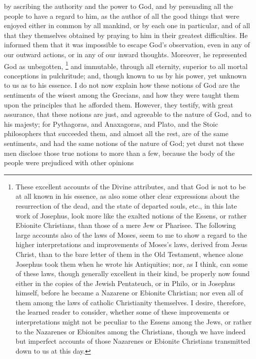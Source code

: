 by ascribing the authority and the power to God, and by persuading all the
people to have a regard to him, as the author of all the good things that
were enjoyed either in common by all mankind, or by each one in
particular, and of all that they themselves obtained by praying to him in
their greatest difficulties. He informed them that it was impossible to
escape God's observation, even in any of our outward actions, or in any of
our inward thoughts. Moreover, he represented God as unbegotten, \footnote{These excellent accounts
of the Divine attributes, and that God is not to be at all known in his
essence, as also some other clear expressions about the resurrection of
the dead, and the state of departed souls, etc., in this late work of
Josephus, look more like the exalted notions of the Essens, or rather
Ebionite Christians, than those of a mere Jew or Pharisee. The following
large accounts also of the laws of Moses, seem to me to show a regard to
the higher interpretations and improvements of Moses's laws, derived from
Jesus Christ, than to the bare letter of them in the Old Testament, whence
alone Josephus took them when he wrote his Antiquities; nor, as I think,
can some of these laws, though generally excellent in their kind, be
properly now found either in the copies of the Jewish Pentateuch, or in
Philo, or in Josephus himself, before he became a Nazarene or Ebionite
Christian; nor even all of them among the laws of catholic Christianity
themselves. I desire, therefore, the learned reader to consider, whether
some of these improvements or interpretations might not be peculiar to the
Essens among the Jews, or rather to the Nazarenes or Ebionites among the
Christians, though we have indeed but imperfect accounts of those
Nazarenes or Ebionite Christians transmitted down to us at this day.}
and immutable, through all eternity, superior to all mortal conceptions in
pulchritude; and, though known to us by his power, yet unknown to us as to
his essence. I do not now explain how these notions of God are the
sentiments of the wisest among the Grecians, and how they were taught them
upon the principles that he afforded them. However, they testify, with
great assurance, that these notions are just, and agreeable to the nature
of God, and to his majesty; for Pythagoras, and Anaxagoras, and Plato, and
the Stoic philosophers that succeeded them, and almost all the rest, are
of the same sentiments, and had the same notions of the nature of God; yet
durst not these men disclose those true notions to more than a few,
because the body of the people were prejudiced with other opinions
